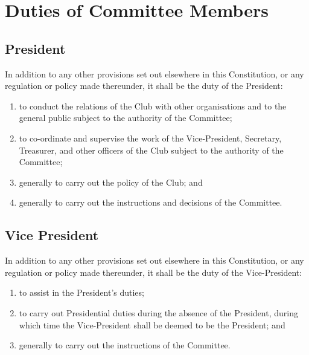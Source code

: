 \documentclass[11pt]{article} %
\begin{document}
\section{Duties of Committee Members}
\subsection{President}
In addition to any other provisions set out elsewhere in this Constitution, or any regulation or policy made thereunder, it shall be the duty of the President:
\begin{enumerate}
	\item to conduct the relations of the Club with other organisations and to the general public subject to the authority of the Committee;
	\item to co-ordinate and supervise the work of the Vice-President, Secretary, Treasurer, and other officers of the Club subject to the authority of the Committee;
	\item generally to carry out the policy of the Club; and
	\item generally to carry out the instructions and decisions of the Committee.
\end{enumerate}

\subsection{Vice President}
In addition to any other provisions set out elsewhere in this Constitution, or any regulation or policy made thereunder, it shall be the duty of the Vice-President:
\begin{enumerate}
	\item to assist in the President's duties;
	\item to carry out Presidential duties during the absence of the President, during which time the Vice-President shall be deemed to be the President; and
	\item generally to carry out the instructions of the Committee.
\end{enumerate}
\end{document}
